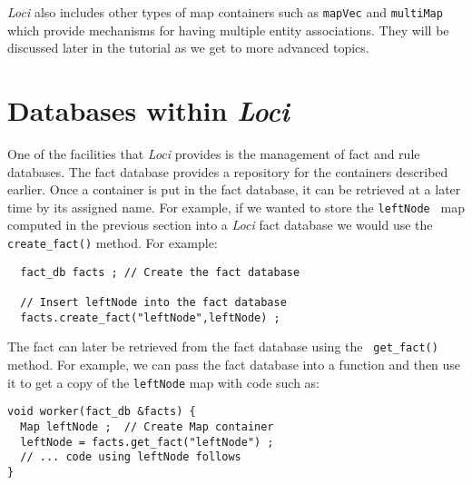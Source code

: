\documentclass[10pt,epsf,letterpaper,twoside]{book}
\begin{document}
{\it Loci} also includes other types of map containers such as {\tt mapVec}
and {\tt multiMap} which provide mechanisms for having multiple entity
associations.  They will be discussed later in the tutorial as we get
to more advanced topics.

\section{Databases within {\it Loci}}

One of the facilities that {\it Loci} provides is the management of fact and
rule databases.  The fact database provides a repository for the
containers described earlier.  Once a container is put in the fact
database, it can be retrieved at a later time by its assigned name.  For example, if we wanted to store the {\tt leftNode } map computed in the previous section into a {\it Loci} fact database we would use the {\tt create\_fact()} method.  For example:
\begin{verbatim}
  fact_db facts ; // Create the fact database
  
  // Insert leftNode into the fact database
  facts.create_fact("leftNode",leftNode) ;
\end{verbatim}
The fact can later be retrieved from the fact database using the {\tt
get\_fact()} method.  For example, we can pass the fact database into
a function and then use it to get a copy of the {\tt leftNode} map
with code such as:
\begin{verbatim}
void worker(fact_db &facts) {
  Map leftNode ;  // Create Map container
  leftNode = facts.get_fact("leftNode") ;
  // ... code using leftNode follows
}
\end{verbatim}
\end{document}

